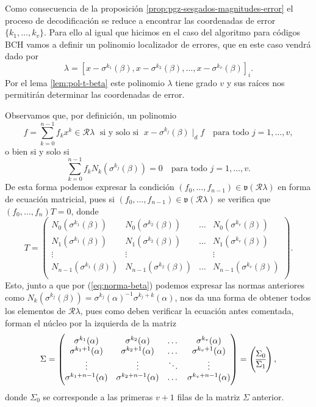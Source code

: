 Como consecuencia de la proposición \ref{prop:pgz-sesgados-magnitudes-error} el proceso de decodificación se reduce a encontrar las coordenadas de error \(\{k_1, \dots, k_v\}\).
Para ello al igual que hicimos en el caso del algoritmo para códigos BCH vamos a definir un polinomio localizador de errores, que en este caso vendrá dado por 
\[
  \lambda = \left[x - \sigma^{k_1}(\beta), x - \sigma^{k_2}(\beta), \dots, x - \sigma^{k_v}(\beta)\right]_{i}.
\]
Por el lema \ref{lem:pol-t-beta} este polinomio \(\lambda\) tiene grado \(v\) y sus raíces nos permitirán determinar las coordenadas de error.

Observamos que, por definición, un polinomio 
\[
  f = \sum_{k = 0}^{n-1}f_k x^{k} \in \mathcal R\lambda \;\text{ si y solo si }\; x - \sigma^{k_j}(\beta) \mid_d f \quad\text{para todo } j = 1, \dots, v,
\]
o bien si y solo si
\[
  \sum_{k=0}^{n -1}f_k N_k(\sigma^{k_j}(\beta))= 0 \quad\text{para todo } j = 1, \dots, v.
\]
De esta forma podemos expresar la condición \((f_0, \dots, f_{n-1}) \in \mathfrak v(\mathcal R\lambda)\) en forma de ecuación matricial, pues si \((f_0, \dots, f_{n-1}) \in \mathfrak v(\mathcal R\lambda)\) se verifica que \((f_0, \dots, f_n)T = 0\), donde
\[
  T = \begin{pmatrix}
    N_{0}(\sigma^{k_1}(\beta)) & N_{0}(\sigma^{k_2}(\beta)) & \dots & N_{0}(\sigma^{k_v}(\beta))\\
    N_{1}(\sigma^{k_1}(\beta)) & N_{1}(\sigma^{k_2}(\beta)) & \dots & N_{1}(\sigma^{k_v}(\beta))\\
    \vdots & \vdots & & \vdots\\
    N_{n-1}(\sigma^{k_1}(\beta)) & N_{n-1}(\sigma^{k_2}(\beta)) & \dots & N_{n-1}(\sigma^{k_v}(\beta))\\
  \end{pmatrix}.
\]
Esto, junto a que por (\ref{eq:norma-beta}) podemos expresar las normas anteriores como \(N_k(\sigma^{k_j}(\beta)) = \sigma^{k_j}(\alpha)^{-1}\sigma^{k_j + k}(\alpha)\), nos da una forma de obtener todos los elementos de \(\mathcal R\lambda\), pues como deben verificar la ecuación antes comentada, forman el núcleo por la izquierda de la matriz
\[
  \Sigma = \begin{pmatrix}
    \sigma^{k_1}(\alpha) & \sigma^{k_2}(\alpha) & \dots & \sigma^{k_v}(\alpha)\\
    \sigma^{k_1 + 1}(\alpha) & \sigma^{k_2 + 1}(\alpha) & \dots & \sigma^{k_v + 1}(\alpha)\\
    \vdots & \vdots & \ddots & \vdots \\
    \sigma^{k_1 + n - 1}(\alpha) & \sigma^{k_2 + n - 1}(\alpha) & \dots & \sigma^{k_v + n - 1}(\alpha)\\
  \end{pmatrix}
  = \left( \begin{array}{@{}c@{}}
    \Sigma_0\\\hline
    \Sigma_1
  \end{array}\right),
\]
donde \(\Sigma_0\) se corresponde a las primeras \(v + 1\) filas de la matriz \(\Sigma\) anterior.

